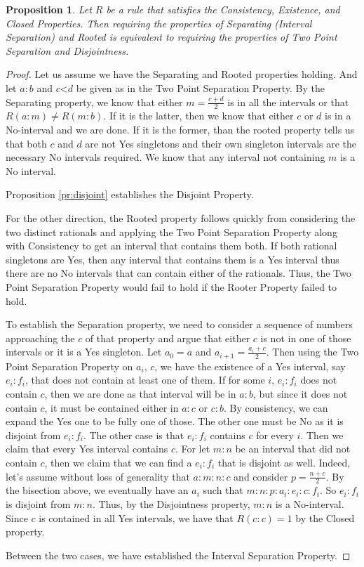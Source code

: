 \documentclass[12pt]{article}
\newtheorem{proposition}{Proposition}
\theoremstyle{remark}
\newcommand{\lt}{\mathord{<}}
\begin{document}
\begin{proposition}
    Let $R$ be a rule that satisfies the Consistency, Existence, and Closed Properties. Then requiring the properties of Separating (Interval Separation) and Rooted is equivalent to requiring the properties of Two Point Separation and Disjointness. 
\end{proposition}

\begin{proof}
    Let us assume we have the Separating and Rooted properties holding. And let $a:b$ and $c\lt d$ be given as in the Two Point Separation Property. By the Separating property, we know that either $m =\frac{c+d}{2}$ is in all the intervals or that $R(a:m) \neq R(m:b)$. If it is the latter, then we know that either $c$ or $d$ is in a No-interval and we are done. If it is the former, than the rooted property tells us that both $c$ and $d$ are not Yes singletons and their own singleton intervals are the necessary No intervals required. We know that any interval not containing $m$ is a No interval. 
    
    Proposition \ref{pr:disjoint} establishes the Disjoint Property. 

    For the other direction, the Rooted property follows quickly from considering the two distinct rationals and applying the Two Point Separation Property along with Consistency to get an interval that contains them both. If both rational singletons are Yes, then any interval that contains them is a Yes interval thus there are no No intervals that can contain either of the rationals. Thus, the Two Point Separation Property would fail to hold if the Rooter Property failed to hold.
    
    To establish the Separation property, we need to consider a sequence of numbers approaching the $c$ of that property and argue that either $c$ is not in one of those intervals or it is a Yes singleton. Let $a_0=a$ and $a_{i+1} = \frac{a_i + c}{2}$. Then using the Two Point Separation Property on $a_i$, $c$, we have the existence of a Yes interval, say $e_i:f_i$, that does not contain at least one of them. If for some $i$,  $e_i:f_i$ does not contain $c$, then we are done as that interval will be in $a:b$, but since it does not contain $c$, it must be contained either in $a:c$ or $c:b$. By consistency, we can expand the Yes one to be fully one of those. The other one must be No as it is disjoint from $e_i:f_i$. The other case is that $e_i:f_i$ contains $c$ for every $i$. Then we claim that every Yes interval contains $c$. For let $m:n$ be an interval that did not contain $c$, then we claim that we can find a $e_i:f_i$ that is disjoint as well. Indeed, let's assume without loss of generality that $a:m:n:c$ and consider $p =\frac{n+c}{2}$. By the bisection above, we eventually have an $a_i$ such that $m:n:p:a_i:e_i:c:f_i$.  So $e_i:f_i$ is disjoint from $m:n$. Thus, by the Disjointness property, $m:n$ is a No-interval. Since $c$ is contained in all Yes intervals, we have that $R(c:c) = 1$ by the Closed property. 

    Between the two cases, we have established the Interval Separation Property. 
\end{proof}
\end{document}
